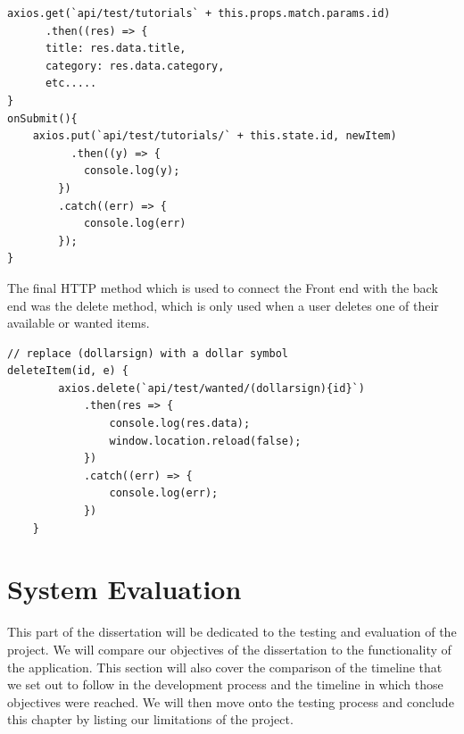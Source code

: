 \begin{verbatim}
axios.get(`api/test/tutorials` + this.props.match.params.id)
      .then((res) => {
      title: res.data.title,
      category: res.data.category,
      etc.....
}
onSubmit(){
    axios.put(`api/test/tutorials/` + this.state.id, newItem)
          .then((y) => {
            console.log(y);
        })
        .catch((err) => {
            console.log(err)
        });
}
\end{verbatim}
The final HTTP method which is used to connect the Front end with the back end was the delete method, which is only used when a user deletes one of their available or wanted items.
\begin{verbatim}
// replace (dollarsign) with a dollar symbol
deleteItem(id, e) {
        axios.delete(`api/test/wanted/(dollarsign){id}`)
            .then(res => {
                console.log(res.data);
                window.location.reload(false);
            })
            .catch((err) => {
                console.log(err);
            })
    }
\end{verbatim}
\chapter{System Evaluation}
This part of the dissertation will be dedicated to the testing and evaluation of the project. We will compare our objectives of the dissertation to the functionality of the application. This section will also cover the comparison of the timeline that we set out to follow in the development process and the timeline in which those objectives were reached. We will then move onto the testing process and conclude this chapter by listing our limitations of the project.\par

